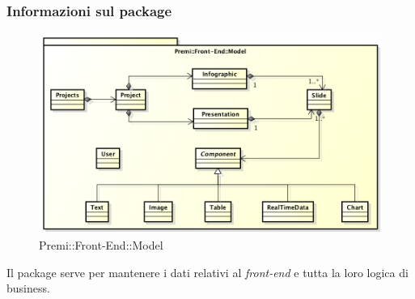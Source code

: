 	\subsubsection*{Informazioni sul package}
		\begin{figure}[h]
			\centering
			\includegraphics[width=0.9\linewidth]{img/front-end_model}
			\caption[Premi::Front-End::Model]{Premi::Front-End::Model}
		\end{figure}
		Il package serve per mantenere i dati relativi al \textit{front-end} e tutta la loro logica di business.

